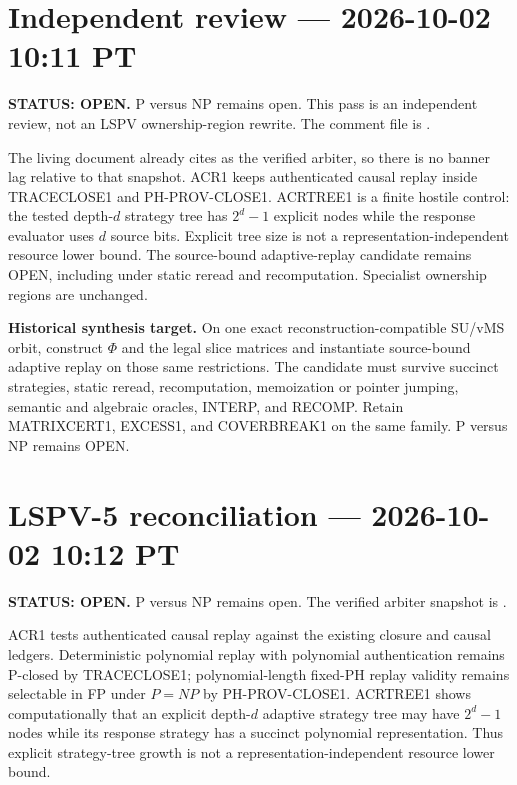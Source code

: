 \documentclass[11pt]{article}
\begin{document}
\section{Independent review --- 2026-10-02 10:11 PT}
\textbf{STATUS: OPEN.} P versus NP remains open. This pass is an independent review, not an
LSPV ownership-region rewrite. The comment file is
.

The living document already cites
 as the verified arbiter, so there is no
banner lag relative to that snapshot. ACR1 keeps authenticated causal replay inside
TRACECLOSE1 and PH-PROV-CLOSE1. ACRTREE1 is a finite hostile control: the tested depth-\(d\)
strategy tree has \(2^d-1\) explicit nodes while the response evaluator uses \(d\) source bits.
Explicit tree size is not a representation-independent resource lower bound. The source-bound
adaptive-replay candidate remains OPEN, including under static reread and recomputation.
Specialist ownership regions are unchanged.

\begin{candidatebox}
\textbf{Historical synthesis target.}
On one exact reconstruction-compatible SU/vMS orbit, construct \(\Phi\) and the legal slice
matrices and instantiate source-bound adaptive replay on those same restrictions. The candidate
must survive succinct strategies, static reread, recomputation, memoization or pointer jumping,
semantic and algebraic oracles, INTERP, and RECOMP. Retain MATRIXCERT1, EXCESS1, and COVERBREAK1
on the same family. P versus NP remains OPEN.
\end{candidatebox}


\section{LSPV-5 reconciliation --- 2026-10-02 10:12 PT}
\textbf{STATUS: OPEN.} P versus NP remains open. The verified arbiter snapshot is
.

ACR1 tests authenticated causal replay against the existing closure and causal ledgers.
Deterministic polynomial replay with polynomial authentication remains P-closed by TRACECLOSE1;
polynomial-length fixed-PH replay validity remains selectable in FP under \(P=NP\) by
PH-PROV-CLOSE1. ACRTREE1 shows computationally that an explicit depth-\(d\) adaptive strategy tree
may have \(2^d-1\) nodes while its response strategy has a succinct polynomial representation.
Thus explicit strategy-tree growth is not a representation-independent resource lower bound.
\end{document}
